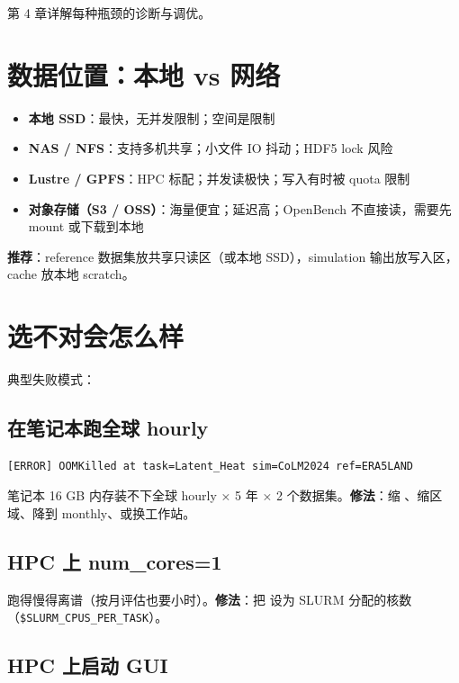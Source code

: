 第 4 章详解每种瓶颈的诊断与调优。

\section{数据位置：本地 vs 网络}

\begin{itemize}
  \item \textbf{本地 SSD}：最快，无并发限制；空间是限制
  \item \textbf{NAS / NFS}：支持多机共享；小文件 IO 抖动；HDF5 lock 风险
  \item \textbf{Lustre / GPFS}：HPC 标配；并发读极快；写入有时被 quota 限制
  \item \textbf{对象存储（S3 / OSS）}：海量便宜；延迟高；OpenBench 不直接读，需要先 mount 或下载到本地
\end{itemize}

\textbf{推荐}：reference 数据集放共享只读区（或本地 SSD），simulation 输出放写入区，cache 放本地 scratch。

\section{选不对会怎么样}

典型失败模式：

\subsection{在笔记本跑全球 hourly}

\begin{verbatim}
[ERROR] OOMKilled at task=Latent_Heat sim=CoLM2024 ref=ERA5LAND
\end{verbatim}

笔记本 16 GB 内存装不下全球 hourly × 5 年 × 2 个数据集。\textbf{修法}：缩 、缩区域、降到 monthly、或换工作站。

\subsection{HPC 上 num\_cores=1}

跑得慢得离谱（按月评估也要小时）。\textbf{修法}：把  设为 SLURM 分配的核数（\texttt{\$SLURM\_CPUS\_PER\_TASK}）。

\subsection{HPC 上启动 GUI}

